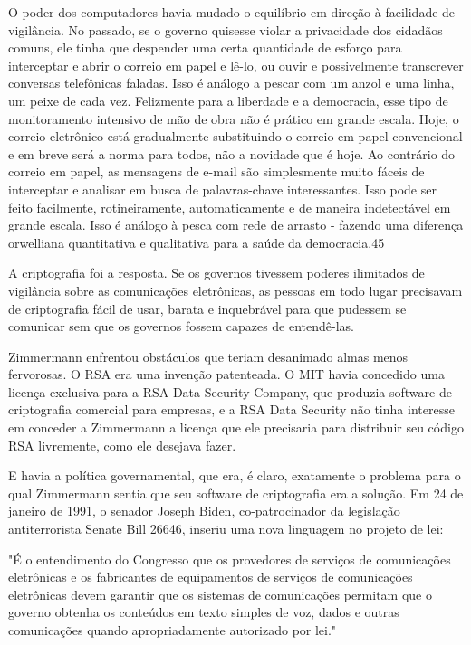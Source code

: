 \documentclass{book}
\begin{document}
O poder dos computadores havia mudado o equilíbrio em direção à facilidade de vigilância. No passado, se o governo quisesse violar a privacidade dos cidadãos comuns, ele tinha que despender uma certa quantidade de esforço para interceptar e abrir o correio em papel e lê-lo, ou ouvir e possivelmente transcrever conversas telefônicas faladas. Isso é análogo a pescar com um anzol e uma linha, um peixe de cada vez. Felizmente para a liberdade e a democracia, esse tipo de monitoramento intensivo de mão de obra não é prático em grande escala. Hoje, o correio eletrônico está gradualmente substituindo o correio em papel convencional e em breve será a norma para todos, não a novidade que é hoje. Ao contrário do correio em papel, as mensagens de e-mail são simplesmente muito fáceis de interceptar e analisar em busca de palavras-chave interessantes. Isso pode ser feito facilmente, rotineiramente, automaticamente e de maneira indetectável em grande escala. Isso é análogo à pesca com rede de arrasto - fazendo uma diferença orwelliana quantitativa e qualitativa para a saúde da democracia.45

A criptografia foi a resposta. Se os governos tivessem poderes ilimitados de vigilância sobre as comunicações eletrônicas, as pessoas em todo lugar precisavam de criptografia fácil de usar, barata e inquebrável para que pudessem se comunicar sem que os governos fossem capazes de entendê-las.

Zimmermann enfrentou obstáculos que teriam desanimado almas menos fervorosas. O RSA era uma invenção patenteada. O MIT havia concedido uma licença exclusiva para a RSA Data Security Company, que produzia software de criptografia comercial para empresas, e a RSA Data Security não tinha interesse em conceder a Zimmermann a licença que ele precisaria para distribuir seu código RSA livremente, como ele desejava fazer.

E havia a política governamental, que era, é claro, exatamente o problema para o qual Zimmermann sentia que seu software de criptografia era a solução. Em 24 de janeiro de 1991, o senador Joseph Biden, co-patrocinador da legislação antiterrorista Senate Bill 26646, inseriu uma nova linguagem no projeto de lei:

"É o entendimento do Congresso que os provedores de serviços de comunicações eletrônicas e os fabricantes de equipamentos de serviços de comunicações eletrônicas devem garantir que os sistemas de comunicações permitam que o governo obtenha os conteúdos em texto simples de voz, dados e outras comunicações quando apropriadamente autorizado por lei."
\end{document}
